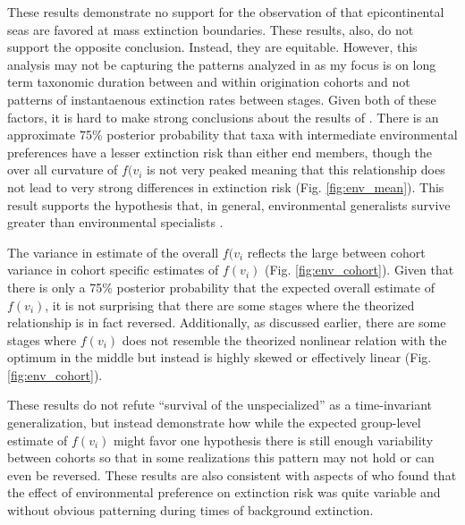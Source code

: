 \documentclass[12pt,letterpaper]{article}
\begin{document}
These results demonstrate no support for the observation of \citet{Miller2009a} that epicontinental seas are favored at mass extinction boundaries. These results, also, do not support the opposite conclusion. Instead, they are equitable. However, this analysis may not be capturing the patterns analyzed in \citet{Miller2009a} as my focus is on long term taxonomic duration between and within origination cohorts and not patterns of instantaenous extinction rates between stages. Given both of these factors, it is hard to make strong conclusions about the results of \citet{Miller2009a}.  
There is an approximate 75\% posterior probability that taxa with intermediate environmental preferences have a lesser extinction risk than either end members, though the over all curvature of \(f(v_{i}\) is not very peaked meaning that this relationship does not lead to very strong differences in extinction risk (Fig. \ref{fig:env_mean}). This result supports the hypothesis that, in general, environmental generalists survive greater than environmental specialists \citep{Simpson1944,Liow2004a,Liow2007b,Nurnberg2013a,Nurnberg2015}.

The variance in estimate of the overall \(f(v_{i}\) reflects the large between cohort variance in cohort specific estimates of \(f(v_{i})\) (Fig. \ref{fig:env_cohort}). Given that there is only a 75\% posterior probability that the expected overall estimate of \(f(v_{i})\), it is not surprising that there are some stages where the theorized relationship is in fact reversed. Additionally, as discussed earlier, there are some stages where \(f(v_{i})\) does not resemble the theorized nonlinear relation with the optimum in the middle but instead is highly skewed or effectively linear (Fig. \ref{fig:env_cohort}). 

These results do not refute ``survival of the unspecialized'' as a time-invariant generalization, but instead demonstrate how while the expected group-level estimate of \(f(v_{i})\) might favor one hypothesis there is still enough variability between cohorts so that in some realizations this pattern may not hold or can even be reversed. These results are also consistent with aspects of \citep{Miller2009a} who found that the effect of environmental preference on extinction risk was quite variable and without obvious patterning during times of background extinction.



\end{document}
